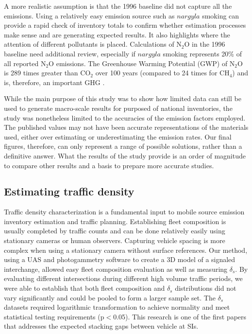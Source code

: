 A more realistic assumption is that the 1996 baseline did not capture all the emissions. Using a relatively easy emission source such as $nargyla$ smoking can provide a rapid check of inventory totals to confirm whether estimation processes make sense and are generating expected results. It also highlights where the attention of different pollutants is placed.  Calculations of N$_{2}$O in the 1996 baseline need additional review, especially if $nargyla$ smoking represents 20\% of all reported N$_{2}$O emissions.  The Greenhouse Warming Potential (GWP) of N$_{2}$O is 289 times greater than CO$_{2}$ over 100 years (compared to 24 times for CH$_{4}$)  and is, therefore, an important GHG \citep{IPCC2007}.

While the main purpose of this study was to show how limited data can still be used to generate macro-scale results for purposed of national inventories, the study was nonetheless limited to the accuracies of the emission factors employed.  The published values may not have been accurate representations of the materials used, either over estimating or underestimating the emission rates. Our final figures, therefore, can only represent a range of possible solutions, rather than a definitive answer.  What the results of the study provide is an order of magnitude to compare other results and a basis to prepare more accurate studies.

\subsection{Estimating traffic density}

Traffic density characterization is a fundamental input to mobile source emission inventory estimation and traffic planning. Establishing fleet composition is usually completed by traffic counts and can be done relatively easily using stationary cameras or human observers. Capturing vehicle spacing is more complex when using a stationary camera without surface references. Our method, using a UAS and photogammetry software to create a 3D model of a signaled interchange, allowed easy fleet composition evaluation as well as measuring $\delta_{s}$. By evaluating different intersections during different high volume traffic periods, we were able to establish that both fleet composition and $\delta_{s}$ distributions did not vary significantly and could be pooled to form a larger sample set. The $\delta_{s}$ datasets required logarithmic transformation to achieve normality and meet statistical testing requirements (p$<$0.05). This research is one of the first papers that addresses the expected stacking gaps between vehicle at SIs.

